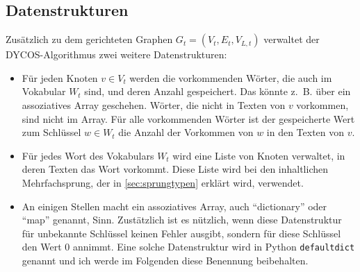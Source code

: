 \subsection{Datenstrukturen}
Zusätzlich zu dem gerichteten Graphen $G_t = (V_t, E_t, V_{L,t})$ 
verwaltet der DYCOS-Algorithmus zwei weitere Datenstrukturen:
\begin{itemize}
    \item Für jeden Knoten $v \in V_t$ werden die vorkommenden Wörter,
          die auch im Vokabular $W_t$ sind,
          und deren Anzahl gespeichert. Das könnte z.~B. über ein 
          assoziatives Array geschehen. Wörter, die nicht in 
          Texten von $v$ vorkommen, sind nicht im Array. Für
          alle vorkommenden Wörter ist der gespeicherte Wert zum 
          Schlüssel $w \in W_t$ die Anzahl der Vorkommen von 
          $w$ in den Texten von $v$.
    \item Für jedes Wort des Vokabulars $W_t$ wird eine Liste von 
          Knoten verwaltet, in deren Texten das Wort vorkommt.
          Diese Liste wird bei den inhaltlichen Mehrfachsprung,
          der in \cref{sec:sprungtypen} erklärt wird,
          verwendet.
    \item An einigen Stellen macht ein assoziatives Array, auch 
          \enquote{dictionary} oder \enquote{map} genannt, Sinn.
          Zustätzlich ist es nützlich, wenn diese Datenstruktur für 
          unbekannte Schlüssel keinen Fehler ausgibt, sondern für diese
          Schlüssel den Wert 0 annimmt. Eine solche Datenstruktur
          wird in Python \texttt{defaultdict} genannt und ich werde
          im Folgenden diese Benennung beibehalten.
\end{itemize}



